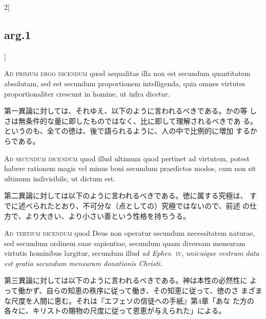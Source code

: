 \documentclass[paper=a4paper,fontsize=10pt,jafontsize=9pt,titlepage]{jlreq}
\begin{document}
\begin{paracol}{2}[\subsection{arg.1}]
\switchcolumn*[\subsection{ad.1}]

{\scshape Ad primum ergo dicendum} quod aequalitas illa non est
 secundum quantitatem absolutam, sed est secundum proportionem
 intelligenda, quia omnes virtutes proportionaliter crescunt in
 homine, ut infra dicetur.

\switchcolumn

第一異論に対しては、それゆえ、以下のように言われるべきである。かの等
 しさは無条件的な量に即したものではなく、比に即して理解されるべきであ
 る。というのも、全ての徳は、後で語られるように、人の中で比例的に増加
 するからである。

\switchcolumn*[\subsection{ad.2}]

{\scshape Ad secundum dicendum} quod illud ultimum quod pertinet ad
 virtutem, potest habere rationem magis vel minus boni secundum
 praedictos modos, cum non sit ultimum indivisibile, ut dictum est.

\switchcolumn

第二異論に対しては以下のように言われるべきである。徳に属する究極は、
 すでに述べられたとおり、不可分な（点としての）究極ではないので、前述
 の仕方で、より大きい、より小さい善という性格を持ちうる。

\switchcolumn*[\subsection{ad.3}]

{\scshape Ad tertium dicendum} quod Deus non operatur secundum
 necessitatem naturae, sed secundum ordinem suae sapientiae, secundum
 quam diversam mensuram virtutis hominibus largitur, secundum illud
 {\itshape ad Ephes}.~{\scshape iv}, {\itshape unicuique vestrum data
 est gratia secundum mensuram donationis Christi}.

\switchcolumn

第三異論に対しては以下のように言われるべきである。神は本性の必然性に
 よって働かず、自らの知恵の秩序に従って働き、その知恵に従って、徳のさ
 まざまな尺度を人間に恵む。それは『エフェソの信徒への手紙』第4章「あな
 た方の各々に、キリストの賜物の尺度に従って恩恵が与えられた」による。

\end{paracol}
\newpage
{}
{}
\setcounter{section}{2}
\setcounter{subsection}{0}
\end{document}
